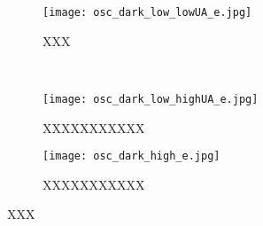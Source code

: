 \begin{figure}[h]
	\centering
	\begin{subfigure}[c]{0.47\textwidth}
	\texttt{[image: osc\_dark\_low\_lowUA\_e.jpg]}
	\caption{XXX}
	\label{fig:dark_lowub}
	\end{subfigure}
	~
	\begin{subfigure}[c]{0.49\textwidth}
	\texttt{[image: osc\_dark\_low\_highUA\_e.jpg]}
	\caption{XXXXXXXXXXX}
	\label{fig:dark_highub}
	\end{subfigure}
	
	\begin{subfigure}[c]{0.47\textwidth}
	\texttt{[image: osc\_dark\_high\_e.jpg]}
	\caption{XXXXXXXXXXX}
	\label{fig:dark_high}
	\end{subfigure}
	\caption{XXX}\label{fig:hgstuff}
\end{figure}

